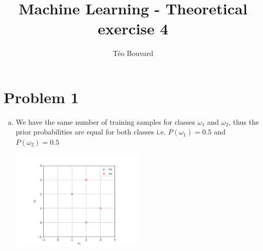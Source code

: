 \documentclass[a4paper, 10pt, twoside]{article}
\begin{document}
\title{Machine Learning - Theoretical exercise 4}
\author{T\'eo Bouvard}
\maketitle

\section*{Problem 1}
\begin{enumerate}[a)]
    \item We have the same number of training samples for classes $\omega_1$ and $\omega_2$, thus the prior probabilities are equal for both classes i.e. $P(\omega_1)=0.5$ and $P(\omega_2)=0.5$

          \begin{center}
              \includegraphics[width=0.5\textwidth]{graph1.png}
          \end{center}


\end{enumerate}
\end{document}
